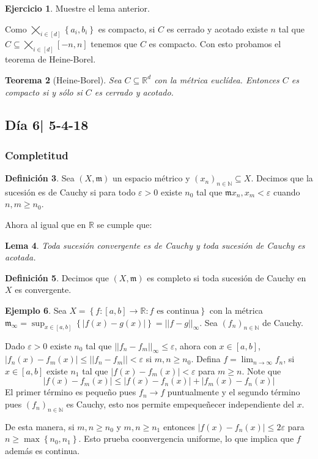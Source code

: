 \documentclass[12pt]{article}
\theoremstyle{plain}
\newtheorem{Th}{Teorema}[subsection]   %
\newtheorem{Lem}[Th]{Lema}             %
\theoremstyle{definition}
\newtheorem{Def}[Th]{Definición}       %
\newtheorem{Ex}[Th]{Ejemplo}               %
\newtheorem{Ej}[Th]{Ejercicio}
\theoremstyle{remark}
\numberwithin{equation}{section}
\newcommand{\bN}{\mathbb{N}}        %
\newcommand{\bR}{\mathbb{R}}        %
\newcommand{\mm}{\mathfrak{m}}      %
\renewcommand{\geq}{\geqslant}      %
\renewcommand{\leq}{\leqslant}      %
\renewcommand{\:}{\colon}           %
\newcommand{\conj}[1]{\left\lbrace#1\right\rbrace}
\newcommand{\bonj}[1]{\left\lbrack#1\right\rbrack}
\begin{document}
\begin{multicols}{2}
\begin{Ej}
  Muestre el lema anterior.
\end{Ej}

\begin{ptcb}

\end{ptcb}

Como $\bigtimes_{i\in\bonj{d}}\conj{a_i,b_i}$ es compacto,  si $C$ es cerrado y acotado existe $n$ tal que $C\subseteq\bigtimes_{i\in\bonj{d}}\bonj{-n,n}$ tenemos que $C$ es compacto. Con esto probamos el teorema de Heine-Borel.
\begin{Th}[Heine-Borel]\label{Heine-Borel}
  Sea $C\subseteq\bR^d$ con la métrica euclídea. Entonces $C$ es compacto si y sólo si $C$ es cerrado y acotado.
\end{Th}

\subsection{Día 6| 5-4-18}

\subsubsection*{Completitud}

\begin{Def}
  Sea $(X,\mm)$ un espacio métrico y $(x_n)_{n\in\bN}\subseteq X$. Decimos que la sucesión es de Cauchy si para todo $\varepsilon>0$ existe $n_0$ tal que $\mm{x_n,x_m}<\varepsilon$ cuando $n,m\geq n_0$.
\end{Def}

Ahora al igual que en $\bR$ se cumple que:

\begin{Lem}
  Toda sucesión convergente es de Cauchy y toda sucesión de Cauchy es acotada.
\end{Lem}

\begin{Def}
  Decimos que $(X,\mm)$ es completo si toda sucesión de Cauchy en $X$ es convergente.
\end{Def}

\begin{Ex}
  Sea $X =\conj{f\colon\bonj{a,b}\to\bR\colon f\text{ es continua}}$ con la métrica $\mm_{\infty}=\sup_{x\in\bonj{a,b}}\conj{|f(x)-g(x)|}=||f-g||_{\infty}$. Sea $(f_n)_{n\in\bN}$ de Cauchy. \par
  Dado $\varepsilon>0$ existe $n_0$ tal que $||f_n-f_m||_{\infty}\leq\varepsilon$, ahora con $x\in\bonj{a,b}$, $|f_n(x)-f_m(x)|\leq ||f_n-f_m||<\varepsilon$ si $m,n\geq n_0$. Defina $f=\lim_{n\to\infty} f_n$, si $x\in\bonj{a,b}$ existe $n_1$ tal que $|f(x)-f_m(x)|<\varepsilon$ para $m\geq n$. Note que
  $$|f(x)-f_m(x)|\leq |f(x)-f_n(x)|+|f_m(x)-f_n(x)|$$
  El primer término es pequeño pues $f_n\to f$ puntualmente y el segundo término pues $(f_n)_{n\in\bN}$ es Cauchy, esto nos permite empequeñecer independiente del $x$. \par
  De esta manera, si $m,n\geq n_0$ y $m,n\geq n_1$ entonces $|f(x)-f_n(x)|\leq 2\varepsilon$ para $n\geq\max\conj{n_0,n_1}$. Esto prueba coonvergencia uniforme, lo que implica que $f$ además es continua.
\end{Ex}


\end{multicols}
\end{document}
